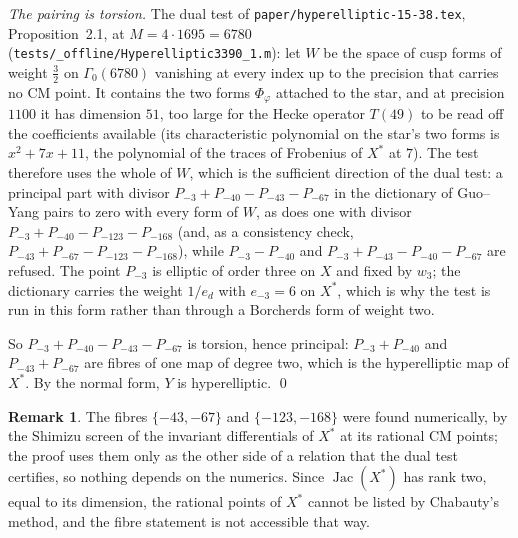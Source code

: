 \documentclass[11pt,reqno]{amsart}
\theoremstyle{plain}
\theoremstyle{definition}
\newtheorem{remark}[theorem]{Remark}
\DeclareMathOperator{\Jac}{Jac}
\begin{document}
\emph{The pairing is torsion.} The dual test of \texttt{paper/hyperelliptic-15-38.tex}, Proposition~2.1, at
$M=4\cdot1695=6780$ (\texttt{tests/\_offline/Hyperelliptic3390\_1.m}): let $W$ be the space of cusp forms of
weight $\tfrac32$ on $\Gamma_0(6780)$ vanishing at every index up to the precision that carries no CM point. It
contains the two forms $\Phi_\varphi$ attached to the star, and at precision $1100$ it has dimension $51$, too
large for the Hecke operator $T(49)$ to be read off the coefficients available (its characteristic polynomial on
the star's two forms is $x^2+7x+11$, the polynomial of the traces of Frobenius of $X^*$ at $7$). The test
therefore uses the whole of $W$, which is the sufficient direction of the dual test: a principal part with
divisor $P_{-3}+P_{-40}-P_{-43}-P_{-67}$ in the dictionary of Guo--Yang pairs to zero with every form of $W$, as
does one with divisor $P_{-3}+P_{-40}-P_{-123}-P_{-168}$ (and, as a consistency check,
$P_{-43}+P_{-67}-P_{-123}-P_{-168}$), while $P_{-3}-P_{-40}$ and $P_{-3}+P_{-43}-P_{-40}-P_{-67}$ are refused. The point $P_{-3}$ is elliptic of order three on $X$ and fixed
by $w_3$; the dictionary carries the weight $1/e_d$ with $e_{-3}=6$ on $X^*$, which is why the test is run in
this form rather than through a Borcherds form of weight two.

So $P_{-3}+P_{-40}-P_{-43}-P_{-67}$ is torsion, hence principal: $P_{-3}+P_{-40}$ and $P_{-43}+P_{-67}$ are
fibres of one map of degree two, which is the hyperelliptic map of $X^*$. By the normal form, $Y$ is
hyperelliptic. \qed

\begin{remark}
The fibres $\{-43,-67\}$ and $\{-123,-168\}$ were found numerically, by the Shimizu screen of the invariant
differentials of $X^*$ at its rational CM points; the proof uses them only as the other side of a relation that
the dual test certifies, so nothing depends on the numerics. Since $\Jac(X^*)$ has rank two, equal to its
dimension, the rational points of $X^*$ cannot be listed by Chabauty's method, and the fibre statement is not
accessible that way.
\end{remark}
\end{document}
